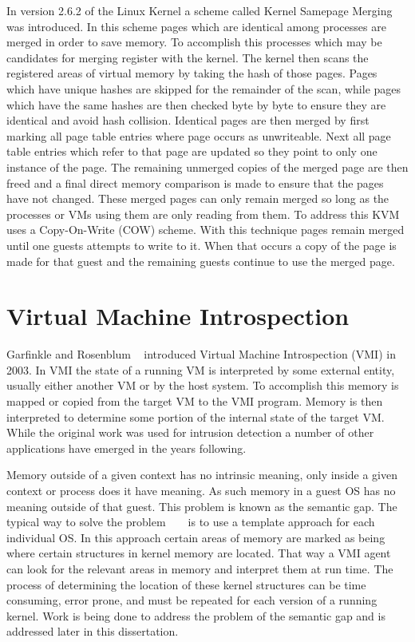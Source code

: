 In version 2.6.2 of the Linux Kernel a scheme called Kernel Samepage Merging ~\cite{arcangeli_increasing_2009} was introduced. In this scheme pages which are identical among processes are merged in order to save memory. To accomplish this processes which may be candidates for merging register with the kernel. The kernel then scans the registered areas of virtual memory by taking the hash of those pages. Pages which have unique hashes are skipped for the remainder of the scan, while pages which have the same hashes are then checked byte by byte to ensure they are identical and avoid hash collision. Identical pages are then merged by first marking all page table entries where page occurs as unwriteable. Next all page table entries which refer to that page are updated so they point to only one instance of the page. The remaining unmerged copies of the merged page are then freed and a final direct memory comparison is made to ensure that the pages have not changed. These merged pages can only remain merged so long as the processes or VMs using them are only reading from them. To address this KVM uses a Copy-On-Write (COW) scheme. With this technique pages remain merged until one guests attempts to write to it. When that occurs a copy of the page is made for that guest and the remaining guests continue to use the merged page. 




\section{Virtual Machine Introspection}

Garfinkle and Rosenblum ~\cite{garfinkel_virtual_2003} introduced Virtual Machine Introspection (VMI) in 2003. In VMI the state of a running VM is interpreted by some external entity, usually either another VM or by the host system. To accomplish this memory is mapped or copied from the target VM to the VMI program. Memory is then interpreted to determine some portion of the internal state of the target VM. While the original work was used for intrusion detection a number of other applications have emerged in the years following. 

Memory outside of a given context has no intrinsic meaning,  only inside a given context or process does it have meaning. As such memory in a guest OS has no meaning outside of that guest. This problem is known as the semantic gap. The typical way to solve the problem ~\cite{garfinkel_virtual_2003} ~\cite{hay_forensics_2008} is to use a template approach for each individual OS. In this approach certain areas of memory are marked as being where certain structures in kernel memory are located.  That way a VMI agent can look for the relevant areas in memory and interpret them at run time.  The process of determining the location of these kernel structures can be time consuming, error prone, and must be repeated for each version of a running kernel. Work is being done to address the problem of the semantic gap and is addressed later in this dissertation. 


